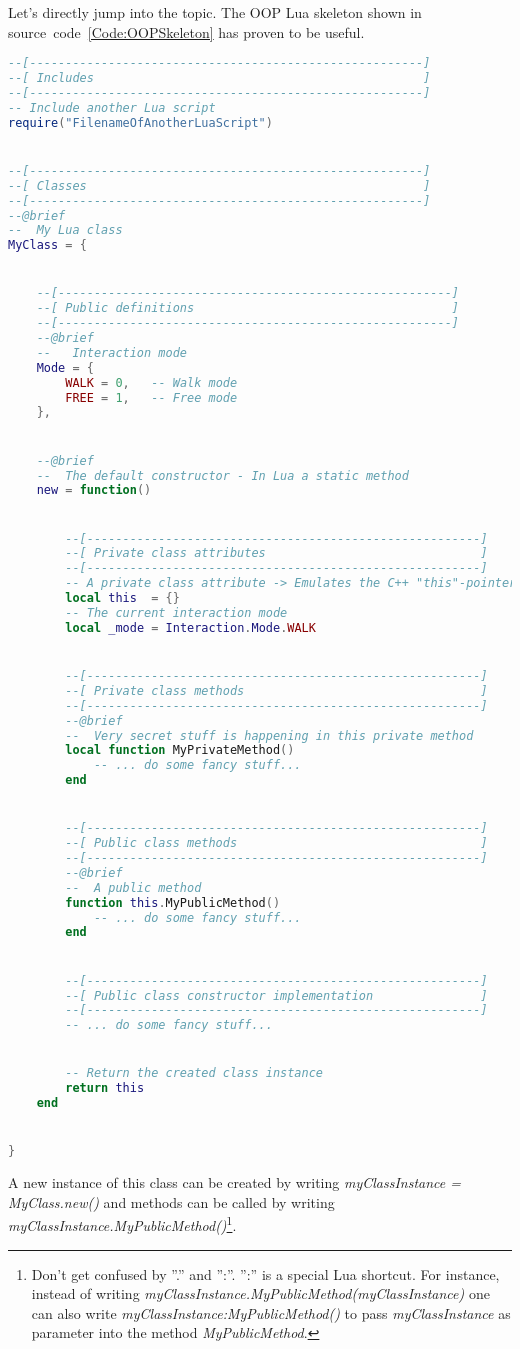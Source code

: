 Let's directly jump into the topic. The \ac{OOP} Lua skeleton shown in source~code~\ref{Code:OOPSkeleton} has proven to be useful.
\begin{lstlisting}[language=lua,label=Code:OOPSkeleton,caption={\ac{OOP} Lua skeleton}]
--[-------------------------------------------------------]
--[ Includes                                              ]
--[-------------------------------------------------------]
-- Include another Lua script
require("FilenameOfAnotherLuaScript")


--[-------------------------------------------------------]
--[ Classes                                               ]
--[-------------------------------------------------------]
--@brief
--  My Lua class
MyClass = {


	--[-------------------------------------------------------]
	--[ Public definitions                                    ]
	--[-------------------------------------------------------]
	--@brief
	--   Interaction mode
	Mode = {
		WALK = 0,	-- Walk mode
		FREE = 1,	-- Free mode
	},


	--@brief
	--  The default constructor - In Lua a static method
	new = function()


		--[-------------------------------------------------------]
		--[ Private class attributes                              ]
		--[-------------------------------------------------------]
		-- A private class attribute -> Emulates the C++ "this"-pointer by using a Lua table
		local this	= {}
		-- The current interaction mode
		local _mode	= Interaction.Mode.WALK


		--[-------------------------------------------------------]
		--[ Private class methods                                 ]
		--[-------------------------------------------------------]
		--@brief
		--  Very secret stuff is happening in this private method
		local function MyPrivateMethod()
			-- ... do some fancy stuff...
		end


		--[-------------------------------------------------------]
		--[ Public class methods                                  ]
		--[-------------------------------------------------------]
		--@brief
		--  A public method
		function this.MyPublicMethod()
			-- ... do some fancy stuff...
		end


		--[-------------------------------------------------------]
		--[ Public class constructor implementation               ]
		--[-------------------------------------------------------]
		-- ... do some fancy stuff...


		-- Return the created class instance
		return this
	end


}
\end{lstlisting}
A new instance of this class can be created by writing \emph{myClassInstance = MyClass.new()} and methods can be called by writing \emph{myClassInstance.MyPublicMethod()}\footnote{Don't get confused by ''.'' and '':''. '':'' is a special Lua shortcut. For instance, instead of writing \emph{myClassInstance.MyPublicMethod(myClassInstance)} one can also write \emph{myClassInstance:MyPublicMethod()} to pass \emph{myClassInstance} as parameter into the method \emph{MyPublicMethod}.}.

